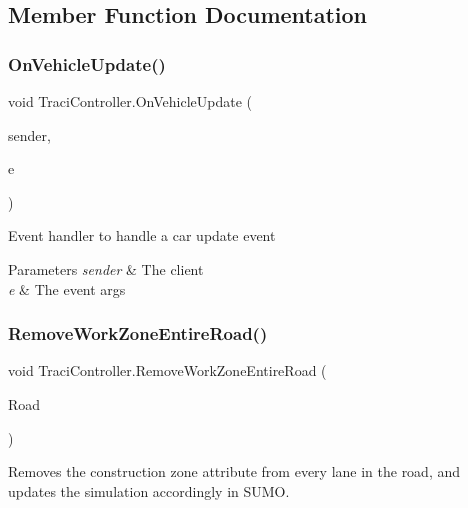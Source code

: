 \subsection{Member Function Documentation}
\mbox{\label{class_traci_controller_ae059ca6ccc3a8ce34a4d133de3d5fade}} 
\subsubsection{\texorpdfstring{OnVehicleUpdate()}{OnVehicleUpdate()}}
{\footnotesize\ttfamily void Traci\+Controller.\+On\+Vehicle\+Update (\begin{DoxyParamCaption}\item[{object}]{sender,  }\item[{Traci.\+Types.\+Subscription\+Event\+Args}]{e }\end{DoxyParamCaption})}



Event handler to handle a car update event 


\begin{DoxyParams}{Parameters}
{\em sender} & The client\\
\hline
{\em e} & The event args\\
\hline
\end{DoxyParams}
\mbox{\label{class_traci_controller_ac1f189c21103504c425bd572a1634759}} 
\subsubsection{\texorpdfstring{RemoveWorkZoneEntireRoad()}{RemoveWorkZoneEntireRoad()}}
{\footnotesize\ttfamily void Traci\+Controller.\+Remove\+Work\+Zone\+Entire\+Road (\begin{DoxyParamCaption}\item[{Game\+Object}]{Road }\end{DoxyParamCaption})}



Removes the construction zone attribute from every lane in the road, and updates the simulation accordingly in S\+U\+MO. 


